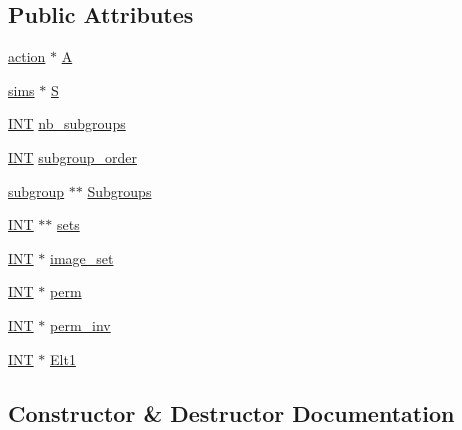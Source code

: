 \subsection*{Public Attributes}
\begin{DoxyCompactItemize}
\item 
\mbox{\hyperlink{classaction}{action}} $\ast$ \mbox{\hyperlink{classaction__on__subgroups_a3ed467feb9730471ea170c4cfc9cb0c3}{A}}
\item 
\mbox{\hyperlink{classsims}{sims}} $\ast$ \mbox{\hyperlink{classaction__on__subgroups_a52bed626bba4cd40ef89132571bb51be}{S}}
\item 
\mbox{\hyperlink{galois_8h_a09fddde158a3a20bd2dcadb609de11dc}{I\+NT}} \mbox{\hyperlink{classaction__on__subgroups_a7373a10ec275b4ec5f7004e0860ed109}{nb\+\_\+subgroups}}
\item 
\mbox{\hyperlink{galois_8h_a09fddde158a3a20bd2dcadb609de11dc}{I\+NT}} \mbox{\hyperlink{classaction__on__subgroups_ad8b26fa522fdfd4d41f31b41c79ef7e5}{subgroup\+\_\+order}}
\item 
\mbox{\hyperlink{classsubgroup}{subgroup}} $\ast$$\ast$ \mbox{\hyperlink{classaction__on__subgroups_a8b6b08b81e27df0cd045dc7f230c2279}{Subgroups}}
\item 
\mbox{\hyperlink{galois_8h_a09fddde158a3a20bd2dcadb609de11dc}{I\+NT}} $\ast$$\ast$ \mbox{\hyperlink{classaction__on__subgroups_a643dc66fb23fe73abcb02ea29be248da}{sets}}
\item 
\mbox{\hyperlink{galois_8h_a09fddde158a3a20bd2dcadb609de11dc}{I\+NT}} $\ast$ \mbox{\hyperlink{classaction__on__subgroups_a40a6e23881b66202b3fc058fc79d3fa7}{image\+\_\+set}}
\item 
\mbox{\hyperlink{galois_8h_a09fddde158a3a20bd2dcadb609de11dc}{I\+NT}} $\ast$ \mbox{\hyperlink{classaction__on__subgroups_af1c1e0731ef655ad11239d8a0a9d92e8}{perm}}
\item 
\mbox{\hyperlink{galois_8h_a09fddde158a3a20bd2dcadb609de11dc}{I\+NT}} $\ast$ \mbox{\hyperlink{classaction__on__subgroups_ac10f644f3958a0dc3bca84777cd7e9fc}{perm\+\_\+inv}}
\item 
\mbox{\hyperlink{galois_8h_a09fddde158a3a20bd2dcadb609de11dc}{I\+NT}} $\ast$ \mbox{\hyperlink{classaction__on__subgroups_ae25b71c30a395ae0fe1e322fe55261e9}{Elt1}}
\end{DoxyCompactItemize}


\subsection{Constructor \& Destructor Documentation}
\mbox{\label{classaction__on__subgroups_a9e134910867f71d372528b9cb0bfccc5}} 
